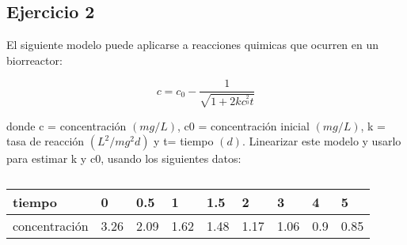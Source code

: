 \documentclass[a4paper,11pt]{article}
\theoremstyle{mytheor}
\begin{document}
\subsection*{Ejercicio 2}

El siguiente modelo puede aplicarse a reacciones quimicas que ocurren en un biorreactor:

\begin{equation*}
    c=c_{0}-\frac{1}{\sqrt{1+2kc^{_{0}^{2}}t}}
\end{equation*}


\noindent donde c = concentración $(mg/L)$, c0 = concentración inicial $(mg/L)$,
k = tasa de reacción $(L^{2}/ mg^{2}d)$ y t= tiempo $(d)$. Linearizar este modelo y usarlo para estimar k y c0, usando los siguientes datos:

\begin{table}[h]
\centering
\begin{tabular}{l|llllllll}
\hline
tiempo & 0    & 0.5  & 1    & 1.5  & 2    & 3    & 4   & 5    \\ \hline
concentración & 3.26 & 2.09 & 1.62 & 1.48 & 1.17 & 1.06 & 0.9 & 0.85 \\ \hline
\end{tabular}
\caption{}
\label{tab:my-table}
\end{table}
\end{document}
